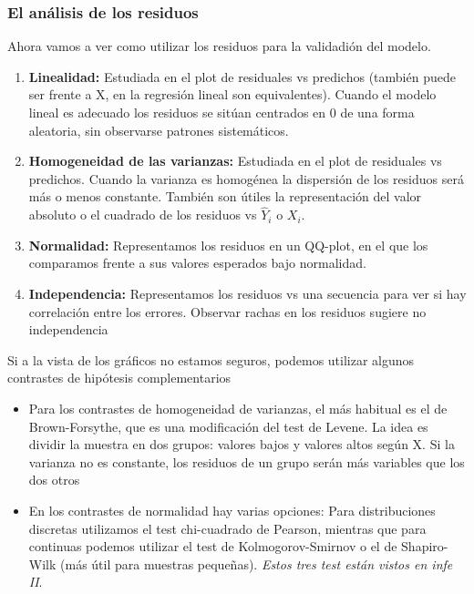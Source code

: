 \subsubsection{El análisis de los residuos}

Ahora vamos a ver como utilizar los residuos para la validadión del modelo.

\begin{enumerate}
    \item \textbf{Linealidad: } Estudiada en el plot de residuales vs predichos (también puede ser frente a X, en la regresión lineal son equivalentes). Cuando el modelo lineal es adecuado los residuos se sitúan centrados en 0 de una forma aleatoria, sin observarse patrones sistemáticos.
    \item \textbf{Homogeneidad de las varianzas: } Estudiada en el plot de residuales vs predichos. Cuando la varianza es homogénea la dispersión de los residuos será más o menos constante. También son útiles la representación del valor absoluto o el cuadrado de los residuos vs $\hat Y_i$ o $X_i$.
    \item \textbf{Normalidad: } Representamos los residuos en un QQ-plot, en el que los comparamos frente a sus valores esperados bajo normalidad. 
    \item \textbf{Independencia: } Representamos los residuos vs una secuencia para ver si hay correlación entre los errores. Observar rachas en los residuos sugiere no independencia
\end{enumerate}

Si a la vista de los gráficos no estamos seguros, podemos utilizar algunos contrastes de hipótesis complementarios

\begin{itemize}
    \item Para los contrastes de homogeneidad de varianzas, el más habitual es el de Brown-Forsythe, que es una modificación del test de Levene. La idea es dividir la muestra en dos grupos: valores bajos y valores altos según X. Si la varianza no es constante, los residuos de un grupo serán más variables que los dos otros
    \item En los contrastes de normalidad hay varias opciones: Para distribuciones discretas utilizamos el test chi-cuadrado de Pearson, mientras que para continuas podemos utilizar el test de Kolmogorov-Smirnov o el de Shapiro-Wilk (más útil para muestras pequeñas). \textit{Estos tres test están vistos en infe II}.
\end{itemize}


